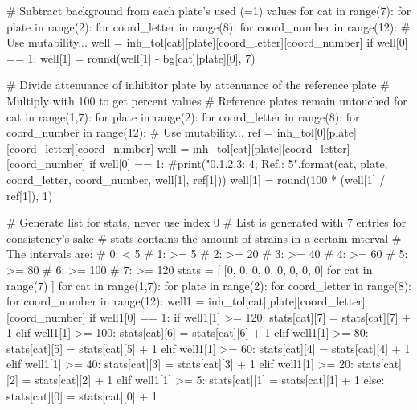 \begin{pycode}
# Subtract background from each plate's used (=1) values
for cat in range(7):
    for plate in range(2):
        for coord_letter in range(8):
            for coord_number in range(12):
                # Use mutability...
                well = inh_tol[cat][plate][coord_letter][coord_number]
                if well[0] == 1:
                    well[1] = round(well[1] - bg[cat][plate][0], 7)

# Divide attenuance of inhibitor plate by attenuance of the reference plate
# Multiply with 100 to get percent values
# Reference plates remain untouched
for cat in range(1,7):
    for plate in range(2):
        for coord_letter in range(8):
            for coord_number in range(12):
                # Use mutability...
                ref = inh_tol[0][plate][coord_letter][coord_number]
                well = inh_tol[cat][plate][coord_letter][coord_number]
                if well[0] == 1:
                    #print("{0}.{1}.{2}.{3}: {4}; Ref.: {5}".format(cat, plate, coord_letter, coord_number, well[1], ref[1]))
                    well[1] = round(100 * (well[1] / ref[1]), 1)

# Generate list for stats, never use index 0
# List is generated with 7 entries for consistency's sake
# stats contains the amount of strains in a certain interval
# The intervals are:
# 0:  <   5%
# 1: >=   5%
# 2: >=  20%
# 3: >=  40%
# 4: >=  60%
# 5: >=  80%
# 6: >= 100%
# 7: >= 120%
stats = [ [0, 0, 0, 0, 0, 0, 0, 0] for cat in range(7) ]
for cat in range(1,7):
    for plate in range(2):
        for coord_letter in range(8):
            for coord_number in range(12):
                well1 = inh_tol[cat][plate][coord_letter][coord_number]
                if well1[0] == 1:
                    if well1[1] >= 120:
                        stats[cat][7] = stats[cat][7] + 1
                    elif well1[1] >= 100:
                        stats[cat][6] = stats[cat][6] + 1
                    elif well1[1] >= 80:
                        stats[cat][5] = stats[cat][5] + 1
                    elif well1[1] >= 60:
                        stats[cat][4] = stats[cat][4] + 1
                    elif well1[1] >= 40:
                        stats[cat][3] = stats[cat][3] + 1
                    elif well1[1] >= 20:
                        stats[cat][2] = stats[cat][2] + 1
                    elif well1[1] >= 5:
                        stats[cat][1] = stats[cat][1] + 1
                    else:
                        stats[cat][0] = stats[cat][0] + 1


\end{pycode}
